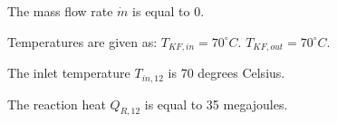 The mass flow rate \( \dot{m} \) is equal to 0.  

Temperatures are given as:  
\( T_{KF,in} = 70^\circ C \).  
\( T_{KF,out} = 70^\circ C \).  

The inlet temperature \( T_{in,12} \) is 70 degrees Celsius.  

The reaction heat \( Q_{R,12} \) is equal to 35 megajoules.